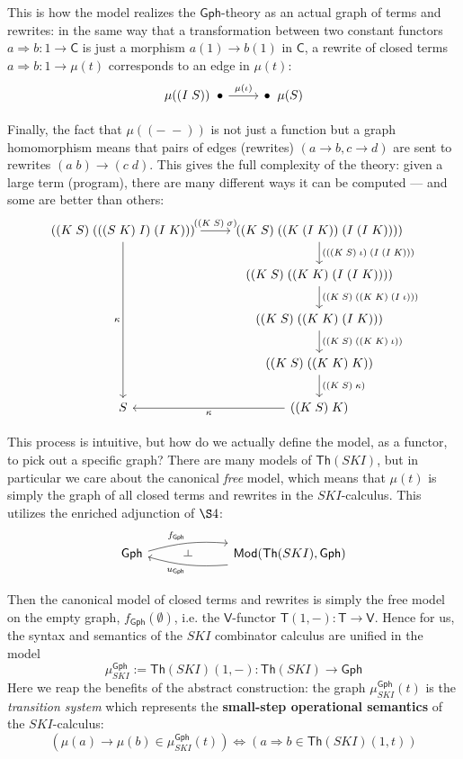 \documentclass{amsart}
\theoremstyle{definition}
\def\ld{\rotatebox[origin=c]{-90}{$\dashv$}} %
\newcommand{\Th}{\mathsf{Th}}
\newcommand{\Gph}{\mathsf{Gph}}
\newcommand{\Mod}{\mathsf{Mod}}
\newcommand{\V}{\mathsf{V}}
\newcommand{\C}{\mathsf{C}}
\newcommand{\T}{\mathsf{T}}
\newcommand{\maps}{\colon}
\begin{document}
This is how the model realizes the $\Gph$-theory as an actual graph of terms and rewrites: in the same way that a transformation between two constant functors $a\Rightarrow b\maps 1\to \C$ is just a morphism $a(1)\to b(1)$ in $\C$, a rewrite of closed terms $a\Rightarrow b\maps 1\to \mu(t)$ corresponds to an edge in $\mu(t)$:
\[\begin{tikzcd}
	\mu((I\; S)) \;\; \bullet \arrow[r,"\mu(\iota)"] & \bullet \;\; \mu(S)
\end{tikzcd}\]

Finally, the fact that $\mu((-\;-))$ is not just a function but a graph homomorphism means that pairs of edges (rewrites) $(a\to b, c\to d)$ are sent to rewrites $(a\; b) \to (c\; d)$. This gives the full complexity of the theory: given a large term (program), there are many different ways it can be computed --- and some are better than others:
\[\begin{tikzcd}
	((K\; S)\; (((S\; K)\; I)\; (I\; K))) \arrow[r,"((K\; S)\; \sigma)"] \arrow[dddd,swap,"\kappa"] & ((K\; S)\; ((K\;(I\; K))\; (I\; (I\; K)))) \arrow[d,"(((K\; S)\; \iota)\; (I\; (I\; K)))"]\\
	& ((K\; S)\; ((K\; K)\; (I\; (I\; K)))) \arrow[d,"((K\; S)\; ((K\; K)\; (I\; \iota)))"]\\
	& ((K\; S)\; ((K\; K)\; (I\; K))) \arrow[d,"((K\; S)\; ((K\; K)\; \iota))"]\\
	& ((K\; S)\; ((K\; K)\; K)) \arrow[d,"((K\; S)\; \kappa)"]\\
	S & ((K\; S)\; K)\arrow[l,"\kappa"]
\end{tikzcd}\]

This process is intuitive, but how do we actually define the model, as a functor, to pick out a specific graph? There are many models of $\Th(SKI)$, but in particular we care about the canonical \textit{free} model, which means that $\mu(t)$ is simply the graph of all closed terms and rewrites in the $SKI$-calculus. This utilizes the enriched adjunction of $\S4$:
\[\begin{tikzcd}
\Gph \arrow[bend left=10,"f_\Gph"]{rr}
& \ld &
\arrow[bend left=10,"u_\Gph"]{ll} \Mod(\Th(SKI),\Gph)
\end{tikzcd}\]

Then the canonical model of closed terms and rewrites is simply the free model on the empty graph, $f_\Gph(\emptyset)$, i.e. the $\V$-functor $\T(1,-)\maps\T\to \V$. Hence for us, the syntax and semantics of the $SKI$ combinator calculus are unified in the model $$\mu_{SKI}^\Gph:= \Th(SKI)(1,-)\maps \Th(SKI) \to \Gph$$ Here we reap the benefits of the abstract construction: the graph $\mu_{SKI}^\Gph(t)$ is the \textit{transition system} which represents the \textbf{small-step operational semantics} of the $SKI$-calculus: $$(\mu(a) \to \mu(b) \in \mu_{SKI}^\Gph(t)) \iff (a \Rightarrow b \in \Th(SKI)(1,t))$$
\end{document}
